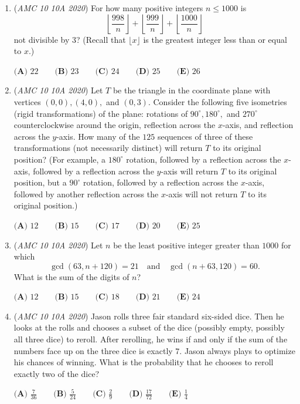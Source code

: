 \begin{enumerate}
	\item (\textit{AMC 10 10A 2020}) For how many positive integers $n \le 1000$ is
 \[\left\lfloor \dfrac{998}{n} \right\rfloor+\left\lfloor \dfrac{999}{n} \right\rfloor+\left\lfloor \dfrac{1000}{n}\right \rfloor\]not divisible by $3$? (Recall that $\lfloor x \rfloor$ is the greatest integer less than or equal to $x$.)


 $\textbf{(A) } 22 \qquad\textbf{(B) } 23 \qquad\textbf{(C) } 24 \qquad\textbf{(D) } 25 \qquad\textbf{(E) } 26$


	\item (\textit{AMC 10 10A 2020}) Let $T$ be the triangle in the coordinate plane with vertices $(0,0), (4,0),$ and $(0,3).$ Consider the following five isometries (rigid transformations) of the plane: rotations of $90^{\circ}, 180^{\circ},$ and $270^{\circ}$ counterclockwise around the origin, reflection across the $x$-axis, and reflection across the $y$-axis. How many of the $125$ sequences of three of these transformations (not necessarily distinct) will return $T$ to its original position? (For example, a $180^{\circ}$ rotation, followed by a reflection across the $x$-axis, followed by a reflection across the $y$-axis will return $T$ to its original position, but a $90^{\circ}$ rotation, followed by a reflection across the $x$-axis, followed by another reflection across the $x$-axis will not return $T$ to its original position.)


 $\textbf{(A) } 12 \qquad \textbf{(B) } 15 \qquad \textbf{(C) } 17 \qquad \textbf{(D) } 20 \qquad \textbf{(E) } 25$


	\item (\textit{AMC 10 10A 2020}) Let $n$ be the least positive integer greater than $1000$ for which
 \[\gcd(63, n+120) =21\quad \text{and} \quad \gcd(n+63, 120)=60.\]What is the sum of the digits of $n$?


 $\textbf{(A) } 12 \qquad\textbf{(B) } 15 \qquad\textbf{(C) } 18 \qquad\textbf{(D) } 21\qquad\textbf{(E) } 24$


	\item (\textit{AMC 10 10A 2020}) Jason rolls three fair standard six-sided dice. Then he looks at the rolls and chooses a subset of the dice (possibly empty, possibly all three dice) to reroll. After rerolling, he wins if and only if the sum of the numbers face up on the three dice is exactly $7.$ Jason always plays to optimize his chances of winning. What is the probability that he chooses to reroll exactly two of the dice?


 $\textbf{(A) } \frac{7}{36} \qquad\textbf{(B) } \frac{5}{24} \qquad\textbf{(C) } \frac{2}{9} \qquad\textbf{(D) } \frac{17}{72} \qquad\textbf{(E) } \frac{1}{4}$


\end{enumerate}